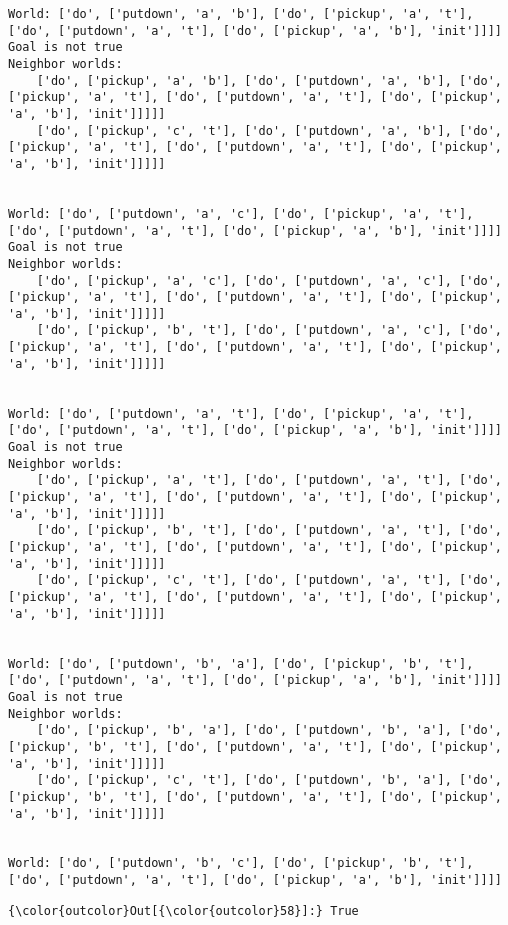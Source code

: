 \documentclass[11pt]{article}
\begin{document}
\begin{Verbatim}[commandchars=\\\{\}]
World: ['do', ['putdown', 'a', 'b'], ['do', ['pickup', 'a', 't'], ['do', ['putdown', 'a', 't'], ['do', ['pickup', 'a', 'b'], 'init']]]]
Goal is not true
Neighbor worlds:
    ['do', ['pickup', 'a', 'b'], ['do', ['putdown', 'a', 'b'], ['do', ['pickup', 'a', 't'], ['do', ['putdown', 'a', 't'], ['do', ['pickup', 'a', 'b'], 'init']]]]]
    ['do', ['pickup', 'c', 't'], ['do', ['putdown', 'a', 'b'], ['do', ['pickup', 'a', 't'], ['do', ['putdown', 'a', 't'], ['do', ['pickup', 'a', 'b'], 'init']]]]]


World: ['do', ['putdown', 'a', 'c'], ['do', ['pickup', 'a', 't'], ['do', ['putdown', 'a', 't'], ['do', ['pickup', 'a', 'b'], 'init']]]]
Goal is not true
Neighbor worlds:
    ['do', ['pickup', 'a', 'c'], ['do', ['putdown', 'a', 'c'], ['do', ['pickup', 'a', 't'], ['do', ['putdown', 'a', 't'], ['do', ['pickup', 'a', 'b'], 'init']]]]]
    ['do', ['pickup', 'b', 't'], ['do', ['putdown', 'a', 'c'], ['do', ['pickup', 'a', 't'], ['do', ['putdown', 'a', 't'], ['do', ['pickup', 'a', 'b'], 'init']]]]]


World: ['do', ['putdown', 'a', 't'], ['do', ['pickup', 'a', 't'], ['do', ['putdown', 'a', 't'], ['do', ['pickup', 'a', 'b'], 'init']]]]
Goal is not true
Neighbor worlds:
    ['do', ['pickup', 'a', 't'], ['do', ['putdown', 'a', 't'], ['do', ['pickup', 'a', 't'], ['do', ['putdown', 'a', 't'], ['do', ['pickup', 'a', 'b'], 'init']]]]]
    ['do', ['pickup', 'b', 't'], ['do', ['putdown', 'a', 't'], ['do', ['pickup', 'a', 't'], ['do', ['putdown', 'a', 't'], ['do', ['pickup', 'a', 'b'], 'init']]]]]
    ['do', ['pickup', 'c', 't'], ['do', ['putdown', 'a', 't'], ['do', ['pickup', 'a', 't'], ['do', ['putdown', 'a', 't'], ['do', ['pickup', 'a', 'b'], 'init']]]]]


World: ['do', ['putdown', 'b', 'a'], ['do', ['pickup', 'b', 't'], ['do', ['putdown', 'a', 't'], ['do', ['pickup', 'a', 'b'], 'init']]]]
Goal is not true
Neighbor worlds:
    ['do', ['pickup', 'b', 'a'], ['do', ['putdown', 'b', 'a'], ['do', ['pickup', 'b', 't'], ['do', ['putdown', 'a', 't'], ['do', ['pickup', 'a', 'b'], 'init']]]]]
    ['do', ['pickup', 'c', 't'], ['do', ['putdown', 'b', 'a'], ['do', ['pickup', 'b', 't'], ['do', ['putdown', 'a', 't'], ['do', ['pickup', 'a', 'b'], 'init']]]]]


World: ['do', ['putdown', 'b', 'c'], ['do', ['pickup', 'b', 't'], ['do', ['putdown', 'a', 't'], ['do', ['pickup', 'a', 'b'], 'init']]]]

    \end{Verbatim}

\begin{Verbatim}[commandchars=\\\{\}]
{\color{outcolor}Out[{\color{outcolor}58}]:} True
\end{Verbatim}
            
\end{document}
